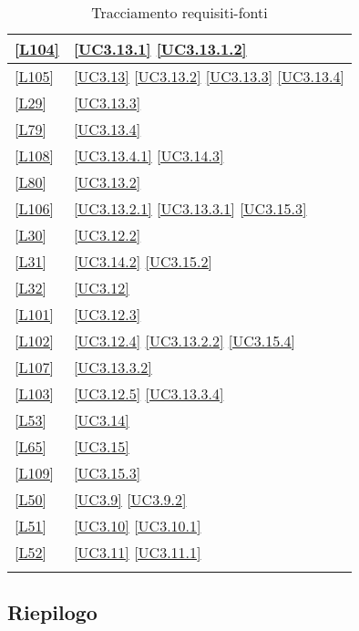 \begin{longtable}{|P{6cm}|P{6cm}|}
	\hline \ref{L104} & \ref{UC3.13.1} \linebreak \ref{UC3.13.1.2} \\
	\hline \ref{L105} & \ref{UC3.13} \linebreak \ref{UC3.13.2} \linebreak \ref{UC3.13.3} \linebreak \ref{UC3.13.4} \\
	\hline \ref{L29} & \ref{UC3.13.3} \\
	\hline \ref{L79} & \ref{UC3.13.4} \\
	\hline \ref{L108} & \ref{UC3.13.4.1} \linebreak \ref{UC3.14.3} \\
	\hline \ref{L80} & \ref{UC3.13.2} \\
	\hline \ref{L106} & \ref{UC3.13.2.1} \ref{UC3.13.3.1} \ref{UC3.15.3} \\
	\hline \ref{L30} & \ref{UC3.12.2} \\
	\hline \ref{L31} & \ref{UC3.14.2} \linebreak \ref{UC3.15.2} \\
	\hline \ref{L32} & \ref{UC3.12} \\
	\hline \ref{L101} & \ref{UC3.12.3} \\
	\hline \ref{L102} & \ref{UC3.12.4} \linebreak \ref{UC3.13.2.2} \linebreak \ref{UC3.15.4} \\
	\hline \ref{L107} & \ref{UC3.13.3.2} \\
	\hline \ref{L103} & \ref{UC3.12.5} \linebreak \ref{UC3.13.3.4} \\
	\hline \ref{L53} & \ref{UC3.14} \\
	\hline \ref{L65} & \ref{UC3.15} \\
	\hline \ref{L109} & \ref{UC3.15.3} \\
	\hline \ref{L50} & \ref{UC3.9} \linebreak \ref{UC3.9.2}\\
	\hline \ref{L51} & \ref{UC3.10} \linebreak \ref{UC3.10.1}\\
	\hline \ref{L52} & \ref{UC3.11} \linebreak \ref{UC3.11.1}\\	
	\hline
	\caption{Tracciamento requisiti-fonti}
\end{longtable}

\subsection{Riepilogo}

